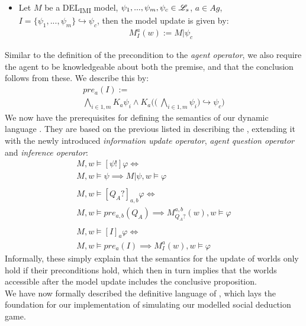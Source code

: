 \begin{itemize}
    \item Let $M$ be a DEL\textsubscript{IMI} model, $\psi_1,...,\psi_m, \psi_c \in
              \mathscr{L}_s$, $a\in Ag$, $I=\{\psi_1,...,\psi_m\} \hookrightarrow \psi_c$, then
          the model update is given by:
          \begin{gather}
              M^a_I(w) := M|\psi_c
          \end{gather}
\end{itemize}
Similar to the definition of the precondition to the \textit{agent operator}, we also require the agent to be knowledgeable about both the premise, and that the conclusion follows from these. We describe this by:
\begin{gather}
    \nonumber pre_{a}(I) := \\ \bigwedge\limits_{i\in1,m}K_a\psi_i \land K_a\Biggl(\Biggl(\:\bigwedge\limits_{i\in 1,m}\psi_i\Biggr) \hookrightarrow \psi_c \Biggr)
\end{gather}
We now have the prerequisites for defining the semantics of our dynamic language \dynlang. They are based on the previous listed in  describing the \staticlang, extending it with the newly introduced \textit{information update operator}, \textit{agent question operator} and \textit{inference operator}:
\begin{equation}
    \begin{gathered}
        M, w \models [\psi!]\varphi \iff \\
        M, w \models \psi \implies M|\psi, w \models \varphi \\\\
        M, w \models [Q_A?]_{a,b}\varphi \iff \\
        M, w \models pre_{a,b}(Q_A) \implies M^{a,b}_{Q_A?}(w), w \models \varphi
        \\\\
        M, w \models [I]_a\varphi \iff \\
        M, w \models pre_a(I) \implies M^a_I(w), w \models \varphi
    \end{gathered}
\end{equation}
Informally, these simply explain that the semantics for the update of worlds only hold if their preconditions hold, which then in turn implies that the worlds accessible after the model update includes the conclusive proposition. \\

We have now formally described the definitive language of \dynlang, which lays
the foundation for our implementation of simulating our modelled social
deduction game.